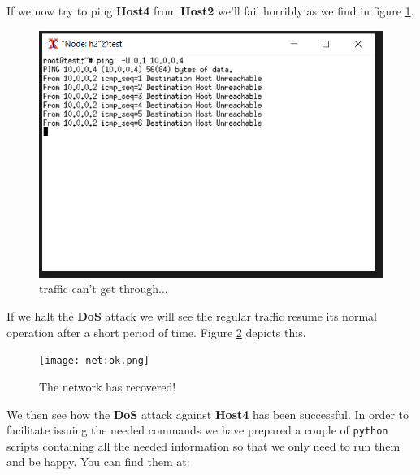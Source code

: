 \documentclass[12pt]{report}
\begin{document}
			If we now try to ping \textbf{Host4} from \textbf{Host2} we'll fail horribly as we find in figure \ref{f:net_down}.

			\begin{figure}
				\centering
				\includegraphics[scale = 1]{net_down.png}
				\caption{ traffic can't get through...}
				\label{f:net_down}
			\end{figure}

			If we halt the \textbf{DoS} attack we will see the regular traffic resume its normal operation after a short period of time. Figure \ref{f:net_ok} depicts this.

			\begin{figure}
				\centering
				\texttt{[image: net:ok.png]}
				\caption{The network has recovered!}
				\label{f:net_ok}
			\end{figure}

			We then see how the \textbf{DoS} attack against \textbf{Host4} has been successful. In order to facilitate issuing the needed commands we have prepared a couple of \texttt{python} scripts containing all the needed information so that we only need to run them and be happy. You can find them at:
\end{document}
